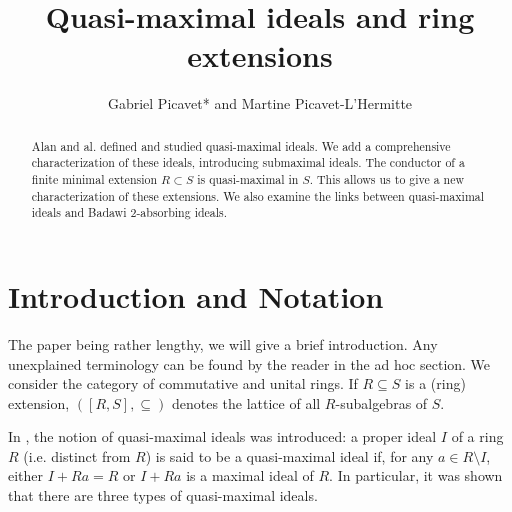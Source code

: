 \documentclass[12pt,leqno]{amsart}
\theoremstyle{definition}
\begin{document}
\title[Quasi-maximal ideals and ring extensions ]{Quasi-maximal ideals and ring extensions}

\author[G. Picavet and M. Picavet]{Gabriel Picavet* and Martine Picavet-L'Hermitte}
\address{Math\'ematiques \\
63670, Le Cendre\\
 France}

\begin{abstract} Alan and al. defined and studied quasi-maximal ideals. We add a comprehensive characterization of these ideals, introducing submaximal ideals. The conductor of a finite minimal extension $R\subset S$ is quasi-maximal in $S$. This allows us to give a new characterization of these extensions. We also examine the links between quasi-maximal ideals and Badawi 2-absorbing ideals.
\end{abstract} 





\maketitle

\section{Introduction and Notation}

The paper being rather lengthy, we will give a brief introduction. Any unexplained terminology can be found by the reader in the ad hoc section.  
We consider the category of commutative and unital rings. If $R\subseteq S$ is a (ring) extension, $([R,S],\subseteq)$ denotes the lattice
 of all $R$-subalgebras of $S$.

In \cite[Definition 1]{AKKT}, the notion of quasi-maximal ideals was   introduced: a proper ideal $I$ of a ring $R$ (i.e. distinct from $R$) is said to be a quasi-maximal ideal if, for any $a\in R\setminus I$, either $I+Ra=R$ or $I+Ra$ is a maximal ideal of $R$. In particular, it was shown \cite[Proposition 3]{AKKT} that there are three types of quasi-maximal ideals. 
\end{document}
